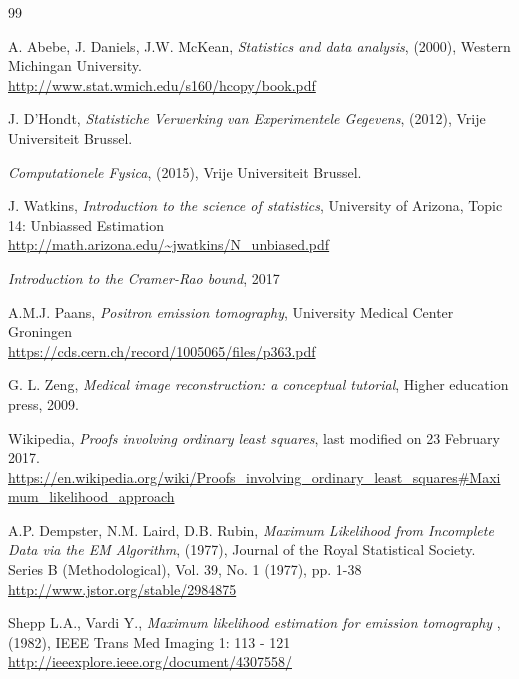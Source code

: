 \documentclass[report,12pt]{report}
\begin{document}
\clearpage
{}
\renewcommand\bibname{References}
\begin{thebibliography}{99}

 A. Abebe, J. Daniels, J.W. McKean, \emph{Statistics and data analysis}, (2000), Western Michingan University.
\\ \url{http://www.stat.wmich.edu/s160/hcopy/book.pdf}

	
 J. D'Hondt, \emph{Statistiche Verwerking van Experimentele Gegevens}, (2012), Vrije Universiteit Brussel.

	
 \emph{Computationele Fysica}, (2015), Vrije Universiteit Brussel.


 J. Watkins, \emph{Introduction to the science of statistics}, University of Arizona, Topic 14: Unbiassed Estimation
	\\ \url{http://math.arizona.edu/~jwatkins/N_unbiased.pdf}
	
	
 \emph{Introduction to the Cramer-Rao bound}, 2017


 A.M.J. Paans, \emph{Positron emission tomography}, University Medical Center Groningen
\\ \url{https://cds.cern.ch/record/1005065/files/p363.pdf}

	
 G. L. Zeng, \emph{Medical image reconstruction: a conceptual tutorial}, Higher education press, 2009.
	
	
 Wikipedia, \emph{Proofs involving ordinary least squares}, last modified on 23 February 2017.
	\\ \url{https://en.wikipedia.org/wiki/Proofs_involving_ordinary_least_squares#Maximum_likelihood_approach}
	
 A.P. Dempster, N.M. Laird, D.B. Rubin, \emph{Maximum Likelihood from Incomplete Data via the EM Algorithm}, (1977), Journal of the Royal Statistical Society. Series B (Methodological), Vol. 39, No. 1 (1977), pp. 1-38
\\ \url{http://www.jstor.org/stable/2984875}
	
	
 Shepp L.A., Vardi Y., \emph{Maximum likelihood estimation for emission tomography }, (1982), IEEE Trans Med Imaging 1: 113 - 121
\\ \url{http://ieeexplore.ieee.org/document/4307558/}
	

\end{thebibliography}
\end{document}
